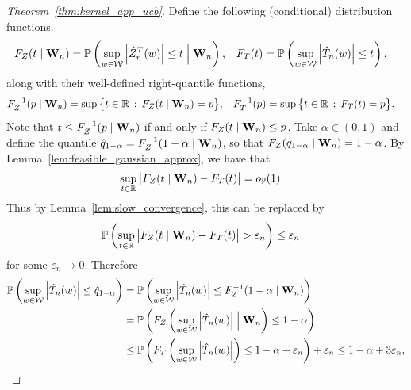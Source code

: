 \begin{proof}[Theorem~\ref{thm:kernel_app_ucb}]
  Define the following (conditional) distribution functions.
  \begin{align*}
    F_Z(t \mid \mathbf{W}_n)
    &=
    \mathbb{P}\left(
      \sup_{w \in \mathcal{W}}
      \left| \hat Z_n^T(w) \right|
      \leq t
      \Bigm\vert \mathbf{W}_n
    \right),
    &F_T(t)
    &=
    \mathbb{P}\left(
      \sup_{w \in \mathcal{W}}
      \left| \hat T_n(w) \right|
      \leq t
    \right),
  \end{align*}
  along with their well-defined right-quantile functions,
  \begin{align*}
    F_Z^{-1}(p \mid \mathbf{W}_n)
    &=
    \sup
    \big\{
    t \in \mathbb{R}
    \, : \,
    F_Z(t \mid \mathbf{W}_n)
    = p
    \big\},
    &F_T^{-1}(p)
    &=
    \sup
    \big\{
    t \in \mathbb{R}
    \, : \,
    F_T(t)
    = p
    \big\}.
  \end{align*}
  Note that
  $t \leq F_Z^{-1}(p \mid \mathbf{W}_n)$
  if and only if
  $F_Z(t \mid \mathbf{W}_n) \leq p$.
  Take $\alpha \in (0,1)$ and
  define the quantile
  $\hat q_{1-\alpha} = F_Z^{-1}(1-\alpha \mid \mathbf{W}_n)$,
  so that
  $F_Z(\hat q_{1-\alpha} \mid \mathbf{W}_n) = 1-\alpha$.
  By Lemma~\ref{lem:feasible_gaussian_approx},
  we have that
  \begin{align*}
    \sup_{t \in \mathbb{R}}
    \big|
    F_Z(t \mid \mathbf{W}_n) - F_T(t)
    \big|
    &=
    o_{\mathbb{P}}(1)
  \end{align*}
  Thus by Lemma~\ref{lem:slow_convergence},
  this can be replaced by
  \begin{align*}
    \mathbb{P}\left(
      \sup_{t \in \mathbb{R}} \big| F_Z(t \mid \mathbf{W}_n) - F_T(t) \big|
      > \varepsilon_n
    \right)
    &\leq \varepsilon_n
  \end{align*}
  for some $\varepsilon_n \to 0$.
  Therefore
  \begin{align*}
    \mathbb{P}\left(
      \sup_{w \in \mathcal{W}}
      \left|
      \hat T_n(w)
      \right|
      \leq
      \hat q_{1-\alpha}
    \right)
    &=
    \mathbb{P}\left(
      \sup_{w \in \mathcal{W}}
      \left|
      \hat T_n(w)
      \right|
      \leq
      F_Z^{-1}(1-\alpha \mid \mathbf{W}_n)
    \right) \\
    &=
    \mathbb{P}\left(
      F_Z\left(
        \sup_{w \in \mathcal{W}}
        \left|
        \hat T_n(w)
        \right|
        \Bigm\vert \mathbf{W}_n
      \right)
      \leq
      1 - \alpha
    \right) \\
    &\leq
    \mathbb{P}\left(
      F_T\left(
        \sup_{w \in \mathcal{W}}
        \left|
        \hat T_n(w)
        \right|
      \right)
      \leq
      1 - \alpha + \varepsilon_n
    \right)
    + \varepsilon_n
    \leq 1 - \alpha + 3\varepsilon_n,
  \end{align*}

\end{proof}
